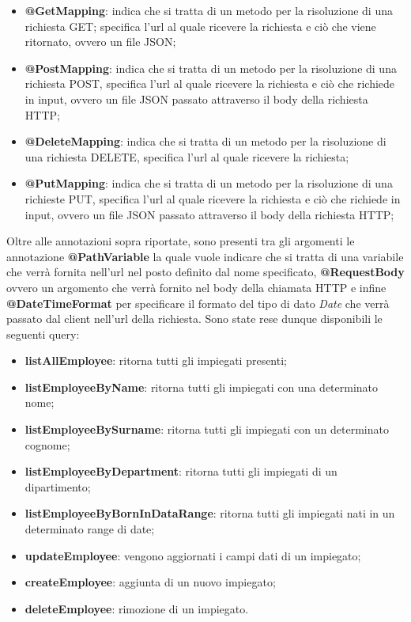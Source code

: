 \begin{itemize}
  \item \textbf{@GetMapping}: indica che si tratta di un metodo per la risoluzione di una richiesta GET; specifica l'url al quale ricevere la richiesta e ciò che viene ritornato, ovvero un file JSON;
  \item \textbf{@PostMapping}: indica che si tratta di un metodo per la risoluzione di una richiesta POST, specifica l'url al quale ricevere la richiesta e ciò che richiede in input, ovvero un file JSON passato attraverso il body della richiesta HTTP;
  \item  \textbf{@DeleteMapping}: indica che si tratta di un metodo per la risoluzione di una richiesta DELETE, specifica l'url al quale ricevere la richiesta;
  \item \textbf{@PutMapping}: indica che si tratta di un metodo per la risoluzione di una richieste PUT, specifica l'url al quale ricevere la richiesta e ciò che richiede in input, ovvero un file JSON passato attraverso il body della richiesta HTTP;
\end{itemize}
Oltre alle annotazioni sopra riportate, sono presenti tra gli argomenti le annotazione \textbf{@PathVariable} la quale vuole indicare che si tratta di una variabile che verrà fornita nell'url nel posto definito dal nome specificato, \textbf{@RequestBody} ovvero un argomento che verrà fornito nel body della chiamata HTTP e infine \textbf{@DateTimeFormat} per specificare il formato del tipo di dato \textit{Date} che verrà passato dal client nell'url della richiesta.
Sono state rese dunque disponibili le seguenti query:
\begin{itemize}
  \item \textbf{listAllEmployee}: ritorna tutti gli impiegati presenti;
  \item \textbf{listEmployeeByName}: ritorna tutti gli impiegati con una determinato nome;
  \item \textbf{listEmployeeBySurname}: ritorna tutti gli impiegati con un determinato cognome;
  \item \textbf{listEmployeeByDepartment}: ritorna tutti gli impiegati di un dipartimento;
  \item \textbf{listEmployeeByBornInDataRange}: ritorna tutti gli impiegati nati in un determinato range di date;
  \item \textbf{updateEmployee}: vengono aggiornati i campi dati di un impiegato;
  \item \textbf{createEmployee}: aggiunta di un nuovo impiegato;
  \item \textbf{deleteEmployee}: rimozione di un impiegato.
\end{itemize}
